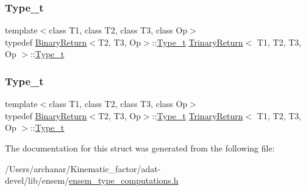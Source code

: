 \mbox{\label{structTrinaryReturn_ac67f5482a7fd12139d0cc6b5ec1cc374}} 
\subsubsection{\texorpdfstring{Type\_t}{Type\_t}\hspace{0.1cm}{\footnotesize\ttfamily [2/3]}}
{\footnotesize\ttfamily template$<$class T1, class T2, class T3, class Op$>$ \\
typedef \mbox{\hyperlink{structBinaryReturn}{Binary\+Return}}$<$T2, T3, Op$>$\+::\mbox{\hyperlink{structTrinaryReturn_ac67f5482a7fd12139d0cc6b5ec1cc374}{Type\+\_\+t}} \mbox{\hyperlink{structTrinaryReturn}{Trinary\+Return}}$<$ T1, T2, T3, Op $>$\+::\mbox{\hyperlink{structTrinaryReturn_ac67f5482a7fd12139d0cc6b5ec1cc374}{Type\+\_\+t}}}

\mbox{\label{structTrinaryReturn_ac67f5482a7fd12139d0cc6b5ec1cc374}} 
\subsubsection{\texorpdfstring{Type\_t}{Type\_t}\hspace{0.1cm}{\footnotesize\ttfamily [3/3]}}
{\footnotesize\ttfamily template$<$class T1, class T2, class T3, class Op$>$ \\
typedef \mbox{\hyperlink{structBinaryReturn}{Binary\+Return}}$<$T2, T3, Op$>$\+::\mbox{\hyperlink{structTrinaryReturn_ac67f5482a7fd12139d0cc6b5ec1cc374}{Type\+\_\+t}} \mbox{\hyperlink{structTrinaryReturn}{Trinary\+Return}}$<$ T1, T2, T3, Op $>$\+::\mbox{\hyperlink{structTrinaryReturn_ac67f5482a7fd12139d0cc6b5ec1cc374}{Type\+\_\+t}}}



The documentation for this struct was generated from the following file\+:\begin{DoxyCompactItemize}
\item 
/\+Users/archanar/\+Kinematic\+\_\+factor/adat-\/devel/lib/ensem/\mbox{\hyperlink{adat-devel_2lib_2ensem_2ensem__type__computations_8h}{ensem\+\_\+type\+\_\+computations.\+h}}\end{DoxyCompactItemize}

